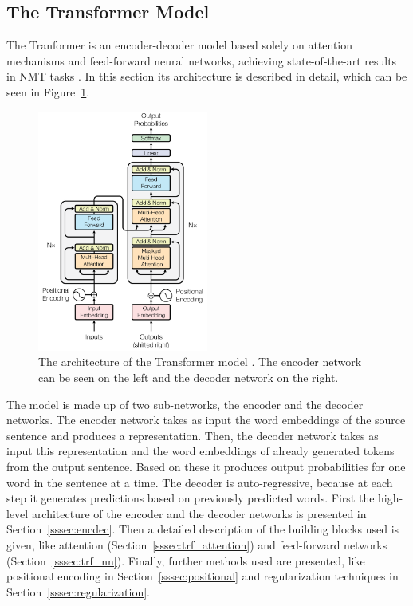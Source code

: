 \documentclass[12pt]{article}
\begin{document}
\subsection{The Transformer Model} \label{ssec:41}
The Tranformer is an encoder-decoder model based solely on attention mechanisms and feed-forward neural networks, achieving state-of-the-art results in NMT tasks \cite{Vaswani:2017}. In this section its architecture is described in detail, which can be seen in Figure~\ref{fig:transformer}.
\begin{figure}[H] 
	\centering
	\includegraphics[width=0.5\textwidth]{pics/transformer.png}
	\caption{The architecture of the Transformer model \cite{Vaswani:2017}. The encoder network can be seen on the left and the decoder network on the right.}
	\label{fig:transformer}
\end{figure}
The model is made up of two sub-networks, the encoder and the decoder networks. The encoder network takes as input the word embeddings of the source sentence and produces a representation. Then, the decoder network takes as input this representation and the word embeddings of already generated tokens from the output sentence. Based on these it produces output probabilities for one word in the sentence at a time. The decoder is auto-regressive, because at each step it generates predictions based on previously predicted words. First the high-level architecture of the encoder and the decoder networks is presented in Section~\ref{sssec:encdec}. Then a detailed description of the building blocks used is given, like attention (Section~\ref{sssec:trf_attention}) and feed-forward networks (Section~\ref{sssec:trf_nn}). Finally, further methods used are presented, like positional encoding in Section~\ref{sssec:positional} and regularization techniques in Section~\ref{sssec:regularization}.
\end{document}
